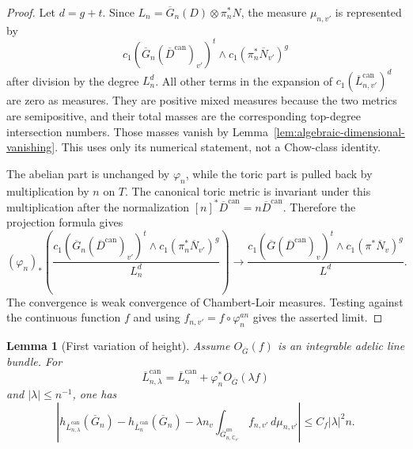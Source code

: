\documentclass[10pt,a4paper]{amsart}
\theoremstyle{plain}
\newtheorem{lemma}[theorem]{Lemma}
\theoremstyle{plain}
\numberwithin{equation}{section}
\providecommand{\ol}{\overline}
\providecommand{\can}{\operatorname{can}}
\begin{document}
\begin{proof}
	Let \(d=g+t\).  Since \(L_n=\ol G_n(D)\otimes\pi_n^*N\), the measure
	\(\mu_{n,v'}\) is represented by
	\[
	c_1(\ol G_n(\ol D^{\can})_{v'})^t
	\wedge c_1(\pi_n^*\ol N_{v'})^g
	\]
	after division by the degree \(L_n^d\).  All other terms in the expansion of
	\(c_1(\ol L^{\can}_{n,v'})^d\) are zero as measures.  They are positive mixed
	measures because the two metrics are semipositive, and their total masses are
	the corresponding top-degree intersection numbers.  Those masses vanish by
	Lemma~\ref{lem:algebraic-dimensional-vanishing}.  This uses only its numerical
	statement, not a Chow-class identity.
	
	The abelian part is unchanged by \(\varphi_n\), while the toric part is pulled
	back by multiplication by \(n\) on \(T\).  The canonical toric metric is
	invariant under this multiplication after the normalization
	\([n]^*\ol D^{\can}=n\ol D^{\can}\).  Therefore the projection formula gives
	\[
	(\varphi_n)_*
	\left(
	\frac{
		c_1(\ol G_n(\ol D^{\can})_{v'})^t
		\wedge c_1(\pi_n^*\ol N_{v'})^g
	}{L_n^d}
	\right)
	\longrightarrow
	\frac{
		c_1(\ol G(\ol D^{\can})_v)^t
		\wedge c_1(\pi^*\ol N_v)^g
	}{L^d}.
	\]
	The convergence is weak convergence of Chambert-Loir measures.  Testing against
	the continuous function \(f\) and using \(f_{n,v'}=f\circ\varphi_n^{an}\) gives
	the asserted limit.
\end{proof}

\begin{lemma}[First variation of height]
	\label{lem:canonical-height-variation}
	Assume \(O_{\ol G}(f)\) is an integrable adelic line bundle.  For
	\[
	\ol L_{n,\lambda}^{\can}
	=
	\ol L_n^{\can}+\varphi_n^*O_{\ol G}(\lambda f)
	\]
	and \(|\lambda|\le n^{-1}\), one has
	\[
	\left|
	h_{\ol L_{n,\lambda}^{\can}}(\ol G_n)
	-h_{\ol L_n^{\can}}(\ol G_n)
	-\lambda n_v
	\int_{\ol G_{n,\mathbb{C}_{v'}}^{an}}f_{n,v'}\,d\mu_{n,v'}
	\right|
	\le C_f|\lambda|^2 n.
	\]
\end{lemma}
\end{document}
